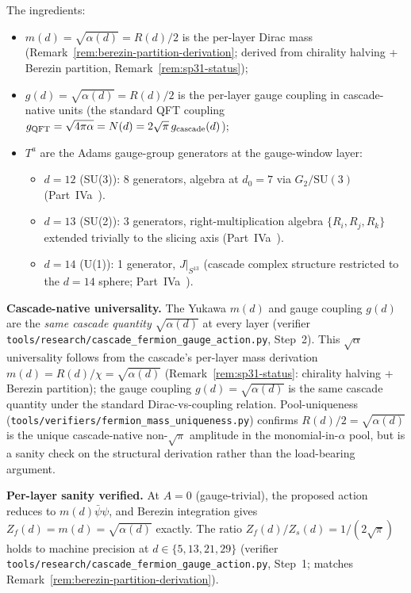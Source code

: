 \documentclass[12pt,a4paper]{article}
\begin{document}
The ingredients:
\begin{itemize}
\item $m(d) = \sqrt{\alpha(d)} = R(d)/2$ is the per-layer Dirac mass
(Remark~\ref{rem:berezin-partition-derivation}; derived from chirality
halving + Berezin partition, Remark~\ref{rem:sp31-status});
\item $g(d) = \sqrt{\alpha(d)} = R(d)/2$ is the per-layer gauge
coupling in cascade-native units (the standard QFT coupling
$g_{\rm QFT} = \sqrt{4\pi\alpha} = N(d) = 2\sqrt{\pi}\,g_{\rm cascade}(d)$);
\item $T^a$ are the Adams gauge-group generators at the gauge-window
layer:
\begin{itemize}
\item $d=12$ (SU(3)): 8 generators, algebra at $d_0=7$ via
  $G_2/\mathrm{SU}(3)$ (Part~IVa~\cite{part4a}).
\item $d=13$ (SU(2)): 3 generators, right-multiplication algebra
  $\{R_i,R_j,R_k\}$ extended trivially to the slicing axis
  (Part~IVa~\cite{part4a}).
\item $d=14$ (U(1)): 1 generator, $J|_{S^{13}}$ (cascade complex
  structure restricted to the $d=14$ sphere; Part~IVa~\cite{part4a}).
\end{itemize}
\end{itemize}

\medskip\noindent\textbf{Cascade-native universality.} The Yukawa
$m(d)$ and gauge coupling $g(d)$ are the \emph{same cascade quantity}
$\sqrt{\alpha(d)}$ at every layer (verifier
\texttt{tools/research/cascade\_fermion\_gauge\_action.py}, Step~2).
This $\sqrt{\alpha}$ universality follows from the cascade's per-layer
mass derivation $m(d) = R(d)/\chi = \sqrt{\alpha(d)}$
(Remark~\ref{rem:sp31-status}: chirality halving + Berezin partition);
the gauge coupling $g(d) = \sqrt{\alpha(d)}$ is the same cascade quantity
under the standard Dirac-vs-coupling relation. Pool-uniqueness
(\texttt{tools/verifiers/fermion\_mass\_uniqueness.py}) confirms
$R(d)/2 = \sqrt{\alpha(d)}$ is the unique cascade-native non-$\sqrt{\pi}$
amplitude in the monomial-in-$\alpha$ pool, but is a sanity check on
the structural derivation rather than the load-bearing argument.

\medskip\noindent\textbf{Per-layer sanity verified.} At $A=0$
(gauge-trivial), the proposed action reduces to
$m(d)\bar\psi\psi$, and Berezin integration gives
$Z_f(d) = m(d) = \sqrt{\alpha(d)}$ exactly. The ratio
$Z_f(d)/Z_s(d) = 1/(2\sqrt{\pi})$ holds to machine precision at
$d\in\{5,13,21,29\}$
(verifier \texttt{tools/research/cascade\_fermion\_gauge\_action.py},
Step~1; matches Remark~\ref{rem:berezin-partition-derivation}).
\end{document}

